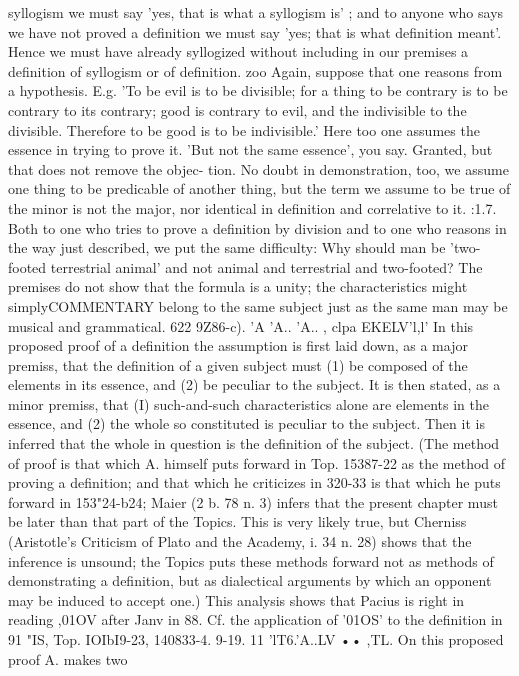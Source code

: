 {{{{{{{{{{{{{{{{{{{{syllogism we must say 'yes, that is what a syllogism is' ; and to
anyone who says we have not proved a definition we must say
'yes; that is what definition meant'. Hence we must have
already syllogized without including in our premises a definition
of syllogism or of definition.
zoo Again, suppose that one reasons from a hypothesis. E.g.
'To be evil is to be divisible; for a thing to be contrary is to be
contrary to its contrary; good is contrary to evil, and the indivisible
to the divisible. Therefore to be good is to be indivisible.' Here too
one assumes the essence in trying to prove it. 'But not the same
essence', you say. Granted, but that does not remove the objec-
tion. No doubt in demonstration, too, we assume one thing to
be predicable of another thing, but the term we assume to be true
of the minor is not the major, nor identical in definition and
correlative to it.
:1.7. Both to one who tries to prove a definition by division and
to one who reasons in the way just described, we put the same
difficulty: Why should man be 'two-footed terrestrial animal' and
not animal and terrestrial and two-footed? The premises do not
show that the formula is a unity; the characteristics might simplyCOMMENTARY
belong to the same subject just as the same man may be musical
and grammatical.
622
9Z86-c). 'A 'A.. 'A.. , clpa
EKELV'l,l'
In this proposed proof of a
definition the assumption is first laid down, as a major premiss,
that the definition of a given subject must (1) be composed of
the elements in its essence, and (2) be peculiar to the subject.
It is then stated, as a minor premiss, that (I) such-and-such
characteristics alone are elements in the essence, and (2) the whole
so constituted is peculiar to the subject. Then it is inferred that
the whole in question is the definition of the subject. (The method
of proof is that which A. himself puts forward in Top. 15387-22
as the method of proving a definition; and that which he criticizes
in 320-33 is that which he puts forward in 153"24-b24; Maier
(2 b. 78 n. 3) infers that the present chapter must be later than
that part of the Topics. This is very likely true, but Cherniss
(Aristotle's Criticism of Plato and the Academy, i. 34 n. 28) shows
that the inference is unsound; the Topics puts these methods
forward not as methods of demonstrating a definition, but as
dialectical arguments by which an opponent may be induced
to accept one.)
This analysis shows that Pacius is right in reading ,01OV after
Janv in 88. Cf. the application of '01OS' to the definition in 91 "IS,
Top. IOIbI9-23, 140833-4.
9-19. 11 'lT6.'A..LV •• ,TL. On this proposed proof A. makes two
}}}}}}}}}}}}}}}}}}}}
